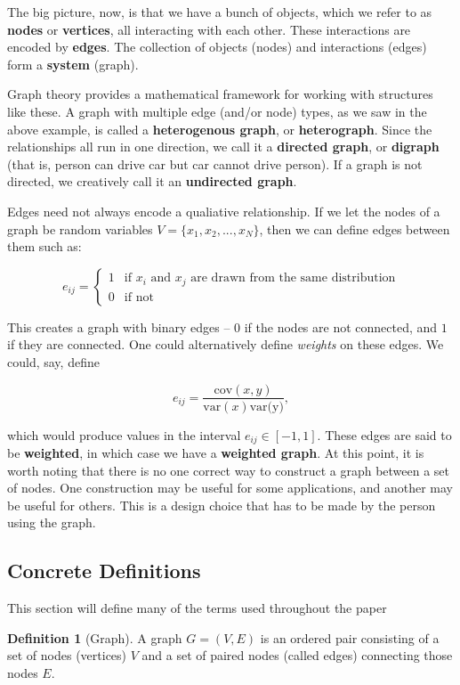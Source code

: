 \documentclass{article}
\theoremstyle{definition}
\newtheorem{definition}{Definition}[section]
\begin{document}
The big picture, now, is that we have a bunch of objects, which we refer to as \textbf{nodes} or \textbf{vertices}, all interacting with each other. These interactions are encoded by \textbf{edges}. The collection of objects (nodes) and interactions (edges) form a \textbf{system} (graph). 

Graph theory provides a mathematical framework for working with structures like these. A graph with multiple edge (and/or node) types, as we saw in the above example, is called a \textbf{heterogenous graph}, or \textbf{heterograph}. Since the relationships all run in one direction, we call it a \textbf{directed graph}, or \textbf{digraph} (that is, person can drive car but car cannot drive person). If a graph is not directed, we creatively call it an \textbf{undirected graph}.

Edges need not always encode a qualiative relationship. If we let the nodes of a graph be random variables $V = \{x_1, x_2, ..., x_N\}$, then we can define edges between them such as:

\[
e_{ij} = \begin{cases}
1 & \text{if }x_i \text{ and } x_j \text{ are drawn from the same distribution} \\ 
0 & \text{if not}
\end{cases}
\]

This creates a graph with binary edges -- $0$ if the nodes are not connected, and $1$ if they are connected. One could alternatively define \textit{weights} on these edges. We could, say, define

\[
e_{ij} = \frac{\text{cov}(x,y)}{\text{var}(x) \text{var(y)}},
\]

which would produce values in the interval $e_{ij} \in [-1, 1]$. These edges are said to be \textbf{weighted}, in which case we have a \textbf{weighted graph}. At this point, it is worth noting that there is no one correct way to construct a graph between a set of nodes. One construction may be useful for some applications, and another may be useful for others. This is a design choice that has to be made by the person using the graph.

\subsection{Concrete Definitions}
\label{sec:definitions}

This section will define many of the terms used throughout the paper

\begin{definition}[Graph]
A graph $G = (V, E)$ is an ordered pair consisting of a set of nodes (vertices) $V$ and a set of paired nodes (called edges) connecting those nodes $E$.
\end{definition}
\end{document}
